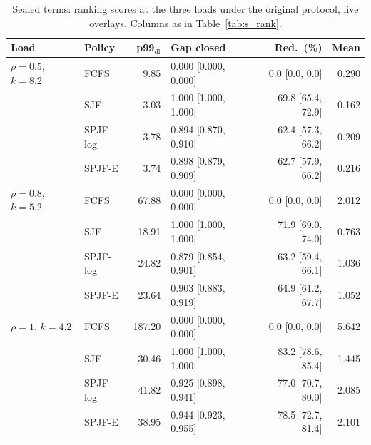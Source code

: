 \documentclass[mathematics,supfile,submit,moreauthors]{Definitions/mdpi}
\newcommand{\sealednum}[1]{#1}
\begin{document}
\begin{table}[htbp]
\centering
\caption{Sealed terms: ranking scores at the three loads under the original protocol, five overlays. Columns as in Table~\ref{tab:s_rank}.}
\label{tab:rank_sealed}
\small
\setlength{\tabcolsep}{3pt}
\begin{tabular}{llrlrr}
\toprule
Load & Policy & p99$_{\mathrm{dl}}$ & Gap closed & Red.\ (\%) & Mean \\
\midrule
$\rho = \sealednum{0.5}$, $k = \sealednum{8.2}$
 & FCFS                 & \sealednum{9.85} & \sealednum{0.000 [0.000, 0.000]} & \sealednum{0.0 [0.0, 0.0]} & \sealednum{0.290} \\
 & SJF                  & \sealednum{3.03} & \sealednum{1.000 [1.000, 1.000]} & \sealednum{69.8 [65.4, 72.9]} & \sealednum{0.162} \\
 & SPJF-log             & \sealednum{3.78} & \sealednum{0.894 [0.870, 0.910]} & \sealednum{62.4 [57.3, 66.2]} & \sealednum{0.209} \\
 & SPJF-E               & \sealednum{3.74} & \sealednum{0.898 [0.879, 0.909]} & \sealednum{62.7 [57.9, 66.2]} & \sealednum{0.216} \\
\midrule
$\rho = \sealednum{0.8}$, $k = \sealednum{5.2}$
 & FCFS                 & \sealednum{67.88} & \sealednum{0.000 [0.000, 0.000]} & \sealednum{0.0 [0.0, 0.0]} & \sealednum{2.012} \\
 & SJF                  & \sealednum{18.91} & \sealednum{1.000 [1.000, 1.000]} & \sealednum{71.9 [69.0, 74.0]} & \sealednum{0.763} \\
 & SPJF-log             & \sealednum{24.82} & \sealednum{0.879 [0.854, 0.901]} & \sealednum{63.2 [59.4, 66.1]} & \sealednum{1.036} \\
 & SPJF-E               & \sealednum{23.64} & \sealednum{0.903 [0.883, 0.919]} & \sealednum{64.9 [61.2, 67.7]} & \sealednum{1.052} \\
\midrule
$\rho = \sealednum{1}$, $k = \sealednum{4.2}$
 & FCFS                 & \sealednum{187.20} & \sealednum{0.000 [0.000, 0.000]} & \sealednum{0.0 [0.0, 0.0]} & \sealednum{5.642} \\
 & SJF                  & \sealednum{30.46} & \sealednum{1.000 [1.000, 1.000]} & \sealednum{83.2 [78.6, 85.4]} & \sealednum{1.445} \\
 & SPJF-log             & \sealednum{41.82} & \sealednum{0.925 [0.898, 0.941]} & \sealednum{77.0 [70.7, 80.0]} & \sealednum{2.085} \\
 & SPJF-E               & \sealednum{38.95} & \sealednum{0.944 [0.923, 0.955]} & \sealednum{78.5 [72.7, 81.4]} & \sealednum{2.101} \\
\bottomrule
\end{tabular}
\end{table}
\end{document}
